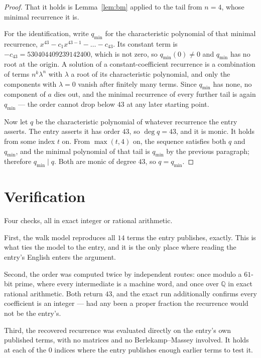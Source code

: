 \documentclass[11pt,a4paper]{article}
\theoremstyle{plain}
\theoremstyle{definition}
\begin{document}
\begin{proof}
That it holds is Lemma~\ref{lem:bm} applied to the tail from $n=4$, whose minimal
recurrence it is.

For the identification, write $q_{\min}$ for the characteristic polynomial of that minimal
recurrence, $x^{43}-c_1x^{43-1}-\dots-c_{43}$. Its constant term is
$-c_{43}=530404409239142400$, which is not zero, so $q_{\min}(0)\neq0$ and $q_{\min}$ has no
root at the origin. A solution of a constant-coefficient recurrence is a combination of terms
$n^{k}\lambda^{n}$ with $\lambda$ a root of its characteristic polynomial, and only the
components with $\lambda=0$ vanish after finitely many terms. Since $q_{\min}$ has none, no
component of $a$ dies out, and the minimal recurrence of every further tail is again
$q_{\min}$ --- the order cannot drop below $43$ at any later starting point.

Now let $q$ be the characteristic polynomial of whatever recurrence the entry asserts. The
entry asserts it has order $43$, so $\deg q=43$, and it is monic. It holds from some
index $t$ on. From $\max(t,4)$ on, the sequence satisfies both $q$ and $q_{\min}$, and
the minimal polynomial of that tail is $q_{\min}$ by the previous paragraph; therefore
$q_{\min}\mid q$. Both are monic of degree $43$, so $q=q_{\min}$.
\end{proof}

\section{Verification}

Four checks, all in exact integer or rational arithmetic.

First, the walk model reproduces all $14$ terms the entry publishes, exactly. This is
what ties the model to the entry, and it is the only place where reading the entry's English
enters the argument.

Second, the order was computed twice by independent routes: once modulo a $61$-bit prime, where
every intermediate is a machine word, and once over $\mathbb{Q}$ in exact rational arithmetic.
Both return $43$, and the exact run additionally confirms every coefficient is an integer
--- had any been a proper fraction the recurrence would not be the entry's.

Third, the recovered recurrence was evaluated directly on the entry's own published terms, with
no matrices and no Berlekamp--Massey involved. It holds at each of the $0$ indices where
the entry publishes enough earlier terms to test it.
\end{document}
